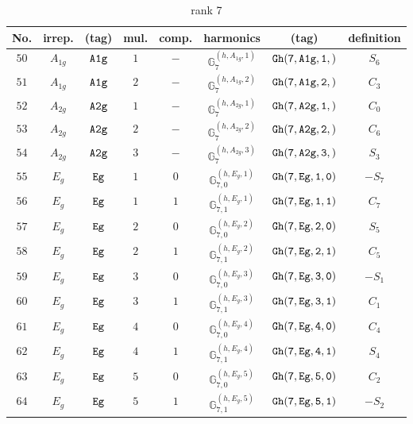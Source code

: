 \documentclass[fleqn,8pt]{jsarticle}
\begin{document}
\begin{table}[ht!]
\begin{center}
\caption{rank 7}
\renewcommand{\arraystretch}{1.3}
\begin{tabular}{cccccccc} \hline \hline
No. & irrep. & (tag) & mul. & comp. & harmonics & (tag) & definition \\ \hline
$ 50 $ & $ A_{1g} $ & $ {\tt A1g} $ & $ 1 $ & $ - $ & $ \mathbb{G}_{7}^{(h,A_{1g},1)} $ & $ {\tt Gh(7,A1g,1,)} $ & $ S_{6} $ \\
$ 51 $ & $ A_{1g} $ & $ {\tt A1g} $ & $ 2 $ & $ - $ & $ \mathbb{G}_{7}^{(h,A_{1g},2)} $ & $ {\tt Gh(7,A1g,2,)} $ & $ C_{3} $ \\
$ 52 $ & $ A_{2g} $ & $ {\tt A2g} $ & $ 1 $ & $ - $ & $ \mathbb{G}_{7}^{(h,A_{2g},1)} $ & $ {\tt Gh(7,A2g,1,)} $ & $ C_{0} $ \\
$ 53 $ & $ A_{2g} $ & $ {\tt A2g} $ & $ 2 $ & $ - $ & $ \mathbb{G}_{7}^{(h,A_{2g},2)} $ & $ {\tt Gh(7,A2g,2,)} $ & $ C_{6} $ \\
$ 54 $ & $ A_{2g} $ & $ {\tt A2g} $ & $ 3 $ & $ - $ & $ \mathbb{G}_{7}^{(h,A_{2g},3)} $ & $ {\tt Gh(7,A2g,3,)} $ & $ S_{3} $ \\
$ 55 $ & $ E_{g} $ & $ {\tt Eg} $ & $ 1 $ & $ 0 $ & $ \mathbb{G}_{7,0}^{(h,E_{g},1)} $ & $ {\tt Gh(7,Eg,1,0)} $ & $ - S_{7} $ \\
$ 56 $ & $ E_{g} $ & $ {\tt Eg} $ & $ 1 $ & $ 1 $ & $ \mathbb{G}_{7,1}^{(h,E_{g},1)} $ & $ {\tt Gh(7,Eg,1,1)} $ & $ C_{7} $ \\
$ 57 $ & $ E_{g} $ & $ {\tt Eg} $ & $ 2 $ & $ 0 $ & $ \mathbb{G}_{7,0}^{(h,E_{g},2)} $ & $ {\tt Gh(7,Eg,2,0)} $ & $ S_{5} $ \\
$ 58 $ & $ E_{g} $ & $ {\tt Eg} $ & $ 2 $ & $ 1 $ & $ \mathbb{G}_{7,1}^{(h,E_{g},2)} $ & $ {\tt Gh(7,Eg,2,1)} $ & $ C_{5} $ \\
$ 59 $ & $ E_{g} $ & $ {\tt Eg} $ & $ 3 $ & $ 0 $ & $ \mathbb{G}_{7,0}^{(h,E_{g},3)} $ & $ {\tt Gh(7,Eg,3,0)} $ & $ - S_{1} $ \\
$ 60 $ & $ E_{g} $ & $ {\tt Eg} $ & $ 3 $ & $ 1 $ & $ \mathbb{G}_{7,1}^{(h,E_{g},3)} $ & $ {\tt Gh(7,Eg,3,1)} $ & $ C_{1} $ \\
$ 61 $ & $ E_{g} $ & $ {\tt Eg} $ & $ 4 $ & $ 0 $ & $ \mathbb{G}_{7,0}^{(h,E_{g},4)} $ & $ {\tt Gh(7,Eg,4,0)} $ & $ C_{4} $ \\
$ 62 $ & $ E_{g} $ & $ {\tt Eg} $ & $ 4 $ & $ 1 $ & $ \mathbb{G}_{7,1}^{(h,E_{g},4)} $ & $ {\tt Gh(7,Eg,4,1)} $ & $ S_{4} $ \\
$ 63 $ & $ E_{g} $ & $ {\tt Eg} $ & $ 5 $ & $ 0 $ & $ \mathbb{G}_{7,0}^{(h,E_{g},5)} $ & $ {\tt Gh(7,Eg,5,0)} $ & $ C_{2} $ \\
$ 64 $ & $ E_{g} $ & $ {\tt Eg} $ & $ 5 $ & $ 1 $ & $ \mathbb{G}_{7,1}^{(h,E_{g},5)} $ & $ {\tt Gh(7,Eg,5,1)} $ & $ - S_{2} $ \\
 \hline \hline
\end{tabular}
\end{center}
\end{table}
\end{document}
